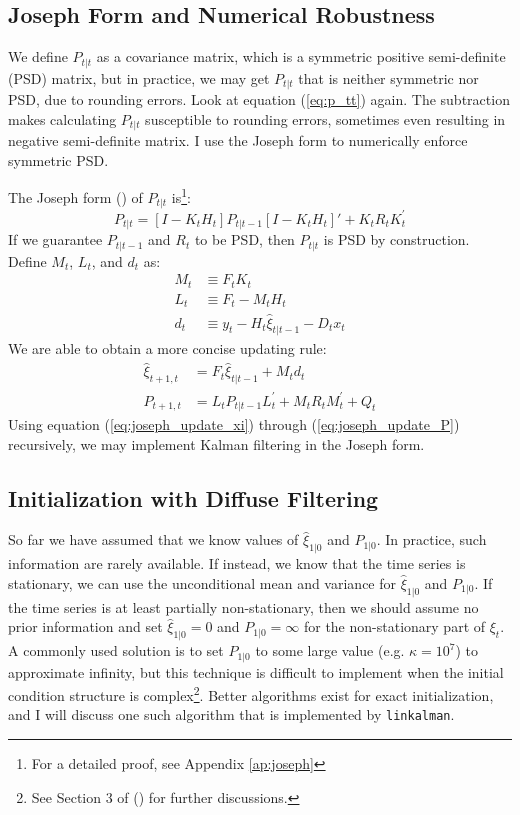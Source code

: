 \documentclass[10pt, titlepage]{article}
\numberwithin{equation}{section}
\begin{document}
\subsection{Joseph Form and Numerical Robustness}
We define $P_{t|t}$ as a covariance matrix, which is a symmetric positive semi-definite (PSD) matrix, but in practice, we may get $P_{t|t}$ that is neither symmetric nor PSD, due to rounding errors. Look at equation (\ref{eq:p_tt}) again. The subtraction makes calculating $P_{t|t}$ susceptible to rounding errors, sometimes even resulting in negative semi-definite matrix. I use the Joseph form to numerically enforce symmetric PSD. 

The Joseph form (\cite{joseph_1968}) of $P_{t|t}$ is\footnote{For a detailed proof, see Appendix \ref{ap:joseph}}:
\[
    P_{t|t} = [I - K_tH_t]P_{t|t-1}[I - K_tH_t]' + K_tR_tK_t^{'}    
\]
If we guarantee $P_{t|t-1}$ and $R_t$ to be PSD, then $P_{t|t}$ is PSD by construction. Define $M_t$, $L_t$, and $d_t$ as:
\begin{align*}
    M_t &\equiv F_tK_t \\
    L_t &\equiv F_t-M_tH_t \\
    d_t &\equiv y_t - H_t\hat{\xi}_{t|t-1} - D_tx_t
\end{align*}
We are able to obtain a more concise updating rule:
\begin{align}
    \hat{\xi}_{t+1,t} &= F_t\hat{\xi}_{t|t-1} + M_td_t \label{eq:joseph_update_xi} \\
    P_{t+1,t} &= L_tP_{t|t-1}L_t^{'} + M_tR_tM_t^{'} + Q_t \label{eq:joseph_update_P}
\end{align}
Using equation (\ref{eq:joseph_update_xi}) through (\ref{eq:joseph_update_P}) recursively, we may implement Kalman filtering in the Joseph form. 

\subsection{Initialization with Diffuse Filtering} \label{subsec:diff_filter}
So far we have assumed that we know values of $\hat{\xi}_{1|0}$ and $P_{1|0}$. In practice, such information are rarely available. If instead, we know that the time series is stationary, we can use the unconditional mean and variance for $\hat{\xi}_{1|0}$ and $P_{1|0}$. If the time series is at least partially non-stationary, then we should assume no prior information and set $\hat{\xi}_{1|0}=0$ and $P_{1|0}=\infty$ for the non-stationary part of $\xi_t$. A commonly used solution is to set $P_{1|0}$ to some large value (e.g. $\kappa=10^7$) to approximate infinity, but this technique is difficult to implement when the initial condition structure is complex\footnote{See Section 3 of (\cite{doan_2010}) for further discussions.}. Better algorithms exist for exact initialization, and I will discuss one such algorithm that is implemented by \texttt{linkalman}.
\end{document}
